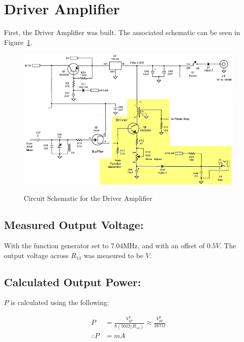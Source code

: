 \section{Driver Amplifier}

First, the Driver Amplifier was built. The associated schematic can be
seen in Figure~\ref{DriverAmp}.

\begin{figure}[h!]
  \centering
  \includegraphics[scale=0.6]{./img/DriverAmp.png}
  \label{DriverAmp}
  \caption{Circuit Schematic for the Driver Amplifier}
\end{figure}

\subsection{Measured Output Voltage: }
With the function generator set to 7.04MHz, and with an offset of 
$0.5V$. The output voltage across $R_{14}$ was measured to be $\boxed{ V}$.

\subsection{Calculated Output Power: }
  $P$ is calculated using the following:

  \begin{align*}
    P &= \frac{V_{pp}^2}{8( 50\Omega||R_{14})}\approx
    \frac{V_{pp}^2}{267\Omega}\\
  \therefore  P &= \boxed{ mA}
  \end{align*}
